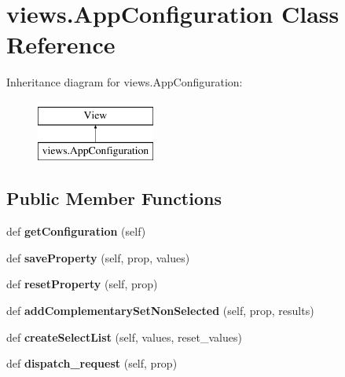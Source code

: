 \hypertarget{classviews_1_1AppConfiguration}{}\section{views.\+App\+Configuration Class Reference}
\label{classviews_1_1AppConfiguration}
Inheritance diagram for views.\+App\+Configuration\+:\begin{figure}[H]
\begin{center}
\leavevmode
\includegraphics[height=2.000000cm]{classviews_1_1AppConfiguration}
\end{center}
\end{figure}
\subsection*{Public Member Functions}
\begin{DoxyCompactItemize}
\item 
\mbox{\label{classviews_1_1AppConfiguration_affec2ae52d2006e0af664c0ca86cda28}} 
def {\bfseries get\+Configuration} (self)
\item 
\mbox{\label{classviews_1_1AppConfiguration_abcbab71c32267506942dc4ddd97b6c1c}} 
def {\bfseries save\+Property} (self, prop, values)
\item 
\mbox{\label{classviews_1_1AppConfiguration_a1ba7baf73bdb2d67d219d06bc0e6824d}} 
def {\bfseries reset\+Property} (self, prop)
\item 
\mbox{\label{classviews_1_1AppConfiguration_ac9161d6f8f7cdd9e54817fecf81715f6}} 
def {\bfseries add\+Complementary\+Set\+Non\+Selected} (self, prop, results)
\item 
\mbox{\label{classviews_1_1AppConfiguration_a83b05a99742d0c05a6b135e591cdd6bc}} 
def {\bfseries create\+Select\+List} (self, values, reset\+\_\+values)
\item 
\mbox{\label{classviews_1_1AppConfiguration_a26b8819441373815a468da57a2c7486d}} 
def {\bfseries dispatch\+\_\+request} (self, prop)
\end{DoxyCompactItemize}
